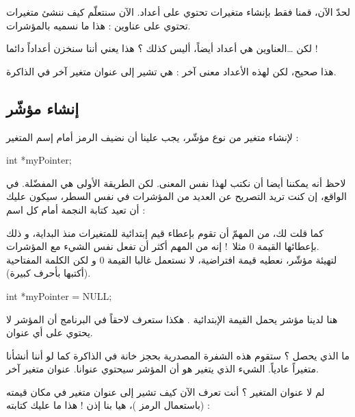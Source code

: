لحدّ الآن، قمنا فقط بإنشاء متغيرات تحتوي على أعداد. الآن سنتعلّم كيف ننشئ متغيرات تحتوي على عناوين : هذا ما نسميه بالمؤشرات.

\begin{question}
	لكن \dots العناوين هي أعداد أيضاً، أليس كذلك ؟ هذا يعني أننا سنخزن أعداداً دائما !
\end{question}

هذا صحيح، لكن لهذه الأعداد معنى آخر : هي تشير إلى عنوان متغير آخر في الذاكرة.

\subsection{إنشاء مؤشّر}

لإنشاء متغير من نوع مؤشّر، يجب علينا أن نضيف الرمز
\InlineCode{*}
أمام إسم المتغير :

\begin{Csource}
int *myPointer;
\end{Csource}

\begin{information}
	
	لاحظ أنه يمكننا أيضا أن نكتب
لهذا نفس المعنى. لكن الطريقة الأولى هي المفضّلة. في الواقع، إن كنت تريد التصريح عن العديد من المؤشرات في نفس السطر، سيكون عليك أن تعيد كتابة النجمة أمام كل اسم :
\end{information}

كما قلت لك، من المهمّ أن تقوم بإعطاء قيم إبتدائية للمتغيرات منذ البداية، و ذلك بإعطائها القيمة 0 مثلا~! إنه من المهم أكثر أن تفعل نفس الشيء مع المؤشرات.\\
لتهيئة مؤشّر، نعطيه قيمة افتراضية، لا نستعمل غالبا القيمة 0 و لكن الكلمة المفتاحية
(أكتبها بأحرف كبيرة).

\begin{Csource}
int *myPointer = NULL;
\end{Csource}

هنا لدينا مؤشر يحمل القيمة الإبتدائية
.
هكذا ستعرف لاحقاً في البرنامج أن المؤشر لا يحتوي على أي عنوان.

ما الذي يحصل ؟ ستقوم هذه الشفرة المصدرية بحجز خانة في الذاكرة كما لو أننا أنشأنا متغيراً عادياً. الشيء الذي يتغير هو أن المؤشر سيحتوي عنوانا. عنوان متغير آخر.

لم لا عنوان المتغير
؟ أنت تعرف الآن كيف تشير إلى عنوان متغير في مكان قيمته (باستعمال الرمز
\InlineCode{\&})،
هيا بنا إذن ! هذا ما عليك كتابته :

